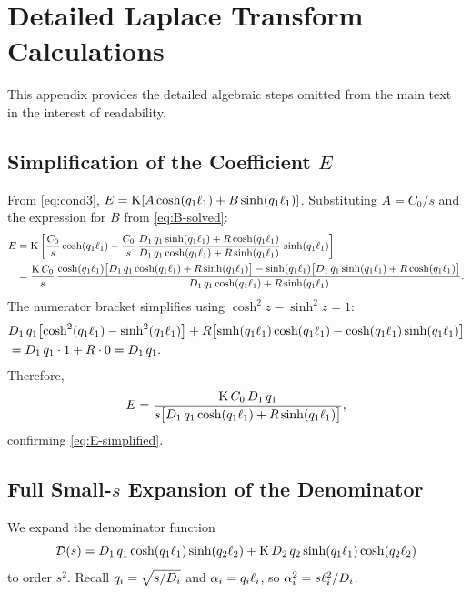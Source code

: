 \section{Detailed Laplace Transform Calculations}
\label{sec:appendix-laplace}

This appendix provides the detailed algebraic steps omitted from the main text
in the interest of readability.

\subsection{Simplification of the Coefficient \texorpdfstring{$E$}{E}}
\label{sec:app-E-simplification}

From \cref{eq:cond3}, $E = \mathrm{K}[A\cosh(q_1\ell_{1}) + B\sinh(q_1\ell_{1})]$.
Substituting $A = C_0/s$ and the expression for $B$ from \cref{eq:B-solved}:
\begin{align}
  E &= \mathrm{K}\left[\frac{C_0}{s}\cosh(q_1\ell_{1})
    - \frac{C_0}{s}\,
    \frac{D_{1}\,q_1\sinh(q_1\ell_{1}) + R\cosh(q_1\ell_{1})}
    {D_{1}\,q_1\cosh(q_1\ell_{1}) + R\sinh(q_1\ell_{1})}
    \,\sinh(q_1\ell_{1})\right]
  \notag\\
  &= \frac{\mathrm{K}\,C_0}{s}\,
    \frac{\cosh(q_1\ell_{1})\bigl[D_{1}\,q_1\cosh(q_1\ell_{1})
      + R\sinh(q_1\ell_{1})\bigr]
      - \sinh(q_1\ell_{1})\bigl[D_{1}\,q_1\sinh(q_1\ell_{1})
      + R\cosh(q_1\ell_{1})\bigr]}
    {D_{1}\,q_1\cosh(q_1\ell_{1}) + R\sinh(q_1\ell_{1})}.
\end{align}
The numerator bracket simplifies using $\cosh^2 z - \sinh^2 z = 1$:
\begin{align}
  &D_{1}\,q_1\bigl[\cosh^2(q_1\ell_{1}) - \sinh^2(q_1\ell_{1})\bigr]
  + R\bigl[\sinh(q_1\ell_{1})\cosh(q_1\ell_{1})
    - \cosh(q_1\ell_{1})\sinh(q_1\ell_{1})\bigr]
  \notag\\
  &= D_{1}\,q_1\cdot 1 + R\cdot 0 = D_{1}\,q_1.
\end{align}
Therefore,
\begin{equation}
  \label{eq:E-final}
  E = \frac{\mathrm{K}\,C_0\,D_{1}\,q_1}
  {s\bigl[D_{1}\,q_1\cosh(q_1\ell_{1}) + R\sinh(q_1\ell_{1})\bigr]},
\end{equation}
confirming \cref{eq:E-simplified}.

\subsection{Full Small-\texorpdfstring{$s$}{s} Expansion of the Denominator}
\label{sec:app-denom-expansion}

We expand the denominator function
\begin{equation}
  \mathcal{D}(s) = D_{1}\,q_1\cosh(q_1\ell_{1})\sinh(q_2\ell_{2})
  + \mathrm{K}\,D_{2}\,q_2\sinh(q_1\ell_{1})\cosh(q_2\ell_{2})
\end{equation}
to order $s^2$.  Recall $q_i = \sqrt{s/D_{i}}$ and
$\alpha_i = q_i\ell_{i}$, so $\alpha_i^2 = s\ell_{i}^2/D_{i}$.

